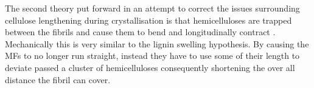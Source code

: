 The second theory put forward in an attempt to correct the issues surrounding
cellulose lengthening during crystallisation is that 
hemicelluloses are trapped between the fibrils and cause them to bend and longitudinally contract \citep{Mellerowicz_2008}. Mechanically this is very similar
to the lignin swelling hypothesis. By causing the MFs to no longer run straight,
instead they have to use some of their length to deviate passed a cluster of
hemicelluloses consequently shortening the over all distance the fibril can
cover. 